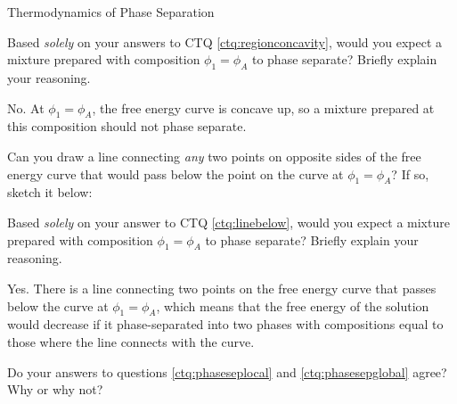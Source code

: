 \begin{activity}{Thermodynamics of Phase Separation}
\begin{ctqs}
\begin{enumerate}
			\end{enumerate}
			
		\question \label{ctq:phaseseplocal} Based \emph{solely} on your answers to CTQ \ref{ctq:regionconcavity}, would you expect a mixture prepared with composition $\phi_1 = \phi_A$ to phase separate?  Briefly explain your reasoning.
					
					\begin{solution}[1.75in]
					
						No. At $\phi_1 = \phi_A$, the free energy curve is concave up, so a mixture prepared at this composition should not phase separate.
					
					\end{solution}
		
		\question \label{ctq:linebelow} Can you draw a line connecting \emph{any} two points on opposite sides of the free energy curve that would pass below the point on the curve at $\phi_1=\phi_A$?  If so, sketch it below:

			\begin{solution}[2.5in]
			\end{solution}
		
		\question \label{ctq:phasesepglobal} Based \emph{solely} on your answer to CTQ \ref{ctq:linebelow}, would you expect a mixture prepared with composition $\phi_1 = \phi_A$ to phase separate?  Briefly explain your reasoning.
		
			\begin{solution}[1.5in]
			
				Yes.  There is a line connecting two points on the free energy curve that passes below the curve at $\phi_1 = \phi_A$, which means that the free energy of the solution would decrease if it phase-separated into two phases with compositions equal to those where the line connects with the curve.
				
			\end{solution}
		
		\question Do your answers to questions \ref{ctq:phaseseplocal} and \ref{ctq:phasesepglobal} agree?  Why or why not?
		

\end{ctqs}
\end{activity}
